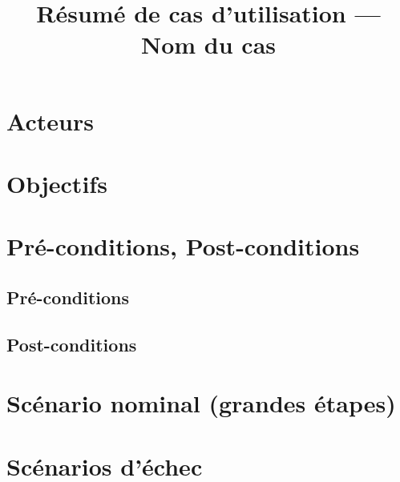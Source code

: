 \documentclass[12pt,a4paper]{article}
\title{Résumé de cas d'utilisation --- Nom du cas} %
\date{} %
\author{} %
\begin{document}
        \maketitle

        \section{Acteurs}

        \section{Objectifs}

        \section{Pré-conditions, Post-conditions}

            \subsection{Pré-conditions}

            \subsection{Post-conditions}

        \section{Scénario nominal (grandes étapes)}

        \section{Scénarios d'échec}

    
\end{document}
